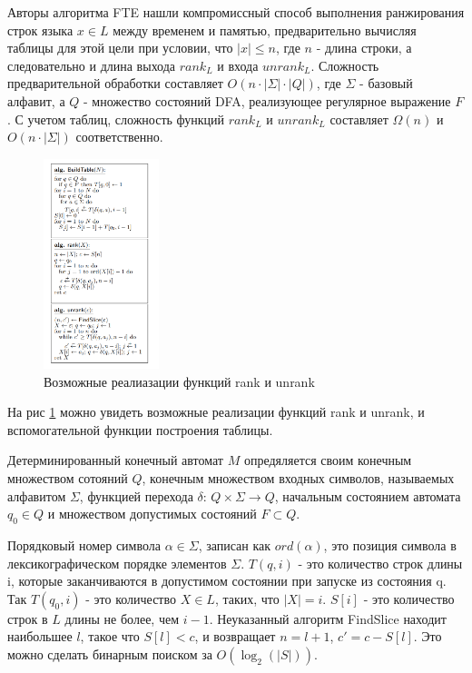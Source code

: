 Авторы алгоритма FTE нашли компромиссный способ выполнения ранжирования строк языка $x \in L$ между временем и памятью,
предварительно вычисляя таблицы для этой цели при условии, что $|x| \leq n$, где $n$ - длина строки, а следовательно и длина выхода $rank_{L}$ и входа $unrank_{L}$.
Сложность предварительной обработки составляет $O(n \cdot |\Sigma| \cdot |Q|)$, где $\Sigma$ - базовый алфавит,
а $Q$ - множество состояний DFA, реализующее регулярное выражение $F$.
С учетом таблиц, сложность функций $rank_{L}$ и $unrank_{L}$ составляет $\Omega(n)$ и $O(n \cdot |\Sigma|)$ соответственно.

\begin{figure}[h!]
    \begin{center}
        \includegraphics[width = 0.3\textwidth]{algos.png}
        \caption{Возможные реалиазации функций rank и unrank}
        \label{algos}
    \end{center}
\end{figure}

На рис \ref{algos} можно увидеть возможные реализации функций rank и unrank, и вспомогательной функции построения таблицы.

Детерминированный конечный автомат $M$ опредяляется своим конечным множеством сотояний $Q$,
конечным множеством входных символов, называемых алфавитом $\Sigma$, функцией перехода $\delta$: $Q \times \Sigma \rightarrow Q$,
начальным состоянием автомата $q_0 \in Q$ и множеством допустимых состояний $F \subset Q$.

Порядковый номер символа $\alpha \in \Sigma$, записан как $ord(\alpha)$, это позиция символа в лексикографическом порядке элементов $\Sigma$.
$T(q, i)$ - это количество строк длины i, которые заканчиваются в допустимом состоянии при запуске из состояния q.
Так $T(q_0, i)$ - это количество $X \in L$, таких, что $|X| = i$.
$S[i]$ - это количество строк в $L$ длины не более, чем $i - 1$.
Неуказанный алгоритм FindSlice находит наибольшее $l$, такое что $S[l] < c$, и возвращает $n = l + 1$, $c' = c - S[l]$.
Это можно сделать бинарным поиском за $O(\log_2(|S|))$.

